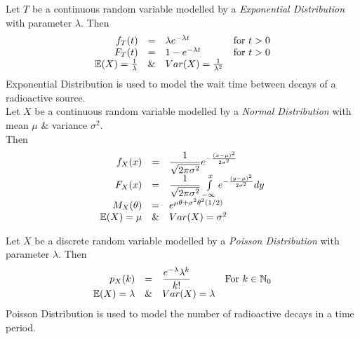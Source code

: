 \documentclass[11pt,a4paper]{article}
\begin{document}
Let $T$ be a continuous random variable modelled by a \textit{Exponential Distribution} with parameter $\lambda$. Then
\[\begin{array}{rcll}
f_T(t)&=&\lambda e^{-\lambda t}&\mathrm{for\ }t>0\\
F_T(t)&=&1-e^{-\lambda t}&\mathrm{for\ }t>0\\
\mathbb{E}(X)=\frac{1}{\lambda}&\&&Var(X)=\frac{1}{\lambda^2}
\end{array}\]
\nb Exponential Distribution is used to model the wait time between decays of a radioactive source.\\

Let $X$ be a continuous random variable modelled by a \textit{Normal Distribution} with mean $\mu$ \& variance $\sigma^2$.\\
Then
\[\begin{array}{rcl}
f_X(x)&=&\dfrac{1}{\sqrt{2\pi\sigma^2}}e^{-\frac{(x-\mu)^2}{2\sigma^2}}\\
F_X(x)&=&\dfrac{1}{\sqrt{2\pi\sigma^2}}\int\limits_{-\infty}^xe^{-\frac{(y-\mu)^2}{2\sigma^2}}dy\\
M_X(\theta)&=&e^{\mu\theta+\sigma^2\theta^2(1/2)}\\
\mathbb{E}(X)=\mu&\&&Var(X)=\sigma^2
\end{array}\]

Let $X$ be a discrete random variable modelled by a \textit{Poisson Distribution} with parameter $\lambda$. Then
\[\begin{array}{rcll}
p_X(k)&=&\dfrac{e^{-\lambda}\lambda^k}{k!}&\mathrm{For\ }k\in\nats_0\\
\expect(X)=\lambda&\&&Var(X)=\lambda
\end{array}\]
\nb Poisson Distribution is used to model the number of radioactive decays in a time period.\\
\end{document}
